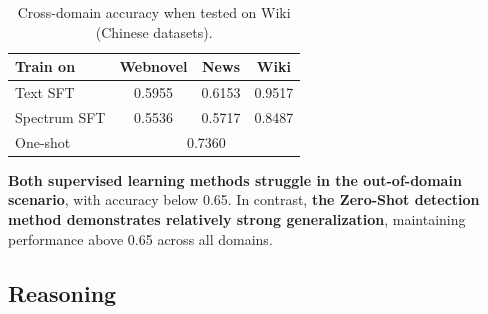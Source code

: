 \documentclass[lettersize,journal]{IEEEtran}
\begin{document}
\begin{table}[H]
\centering
\begin{tabular}{|l|c|c|c|}
\hline
Train on & Webnovel & News & Wiki \\
\hline
Text SFT     & 0.5955 & 0.6153 & 0.9517 \\
\hline
Spectrum SFT & 0.5536 & 0.5717 & 0.8487 \\
\hline
One-shot     & \multicolumn{3}{c|}{0.7360} \\
\hline
\end{tabular}
\caption{Cross-domain accuracy when tested on Wiki (Chinese datasets).}
\end{table}


\textbf{Both supervised learning methods struggle in the out-of-domain scenario}, with accuracy below 0.65. In contrast, \textbf{the Zero-Shot detection method demonstrates relatively strong generalization}, maintaining performance above 0.65 across all domains.

\subsection{Reasoning}
\end{document}
